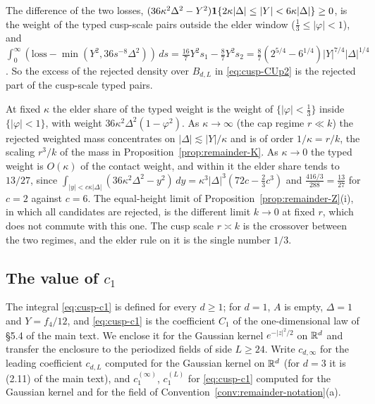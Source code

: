 \begin{remark}\label{rem:cusp-rejected}
The difference of the two losses, $(36\kappa^2\Delta^2-Y^2)\mathbf 1\{2\kappa|\Delta|\le|Y|<6\kappa|\Delta|\}\ge0$, is the weight of the typed cusp-scale pairs outside the elder window ($\frac13\le|\varphi|<1$), and $\int_0^\infty(\mathrm{loss}-\min(Y^2,36s^{-8}\Delta^2))\,ds=\frac{16}7Y^2s_1-\frac87Y^2s_2=\frac87(2^{5/4}-6^{1/4})|Y|^{7/4}|\Delta|^{1/4}$. So the excess of the rejected density over $B_{d,L}$ in \eqref{eq:cusp-CUp2} is the rejected part of the cusp-scale typed pairs.
\end{remark}

\begin{remark}\label{rem:cusp-crossover}
At fixed $\kappa$ the elder share of the typed weight is the weight of $\{|\varphi|<\frac13\}$ inside $\{|\varphi|<1\}$, with weight $36\kappa^2\Delta^2(1-\varphi^2)$. As $\kappa\to\infty$ (the cap regime $r\ll k$) the rejected weighted mass concentrates on $|\Delta|\lesssim|Y|/\kappa$ and is of order $1/\kappa=r/k$, the scaling $r^3/k$ of the mass in Proposition~\ref{prop:remainder-K}. As $\kappa\to0$ the typed weight is $O(\kappa)$ of the contact weight, and within it the elder share tends to $13/27$, since $\int_{|y|<c\kappa|\Delta|}(36\kappa^2\Delta^2-y^2)\,dy=\kappa^3|\Delta|^3(72c-\frac23c^3)$ and $\frac{416/3}{288}=\frac{13}{27}$ for $c=2$ against $c=6$. The equal-height limit of Proposition~\ref{prop:remainder-Z}(i), in which all candidates are rejected, is the different limit $k\to0$ at fixed $r$, which does not commute with this one. The cusp scale $r\asymp k$ is the crossover between the two regimes, and the elder rule on it is the single number $1/3$.
\end{remark}

\subsection{The value of \texorpdfstring{$c_1$}{c1}}\label{ssec:cusp-value}

The integral \eqref{eq:cusp-c1} is defined for every $d\ge1$; for $d=1$, $A$ is empty, $\Delta=1$ and $Y=f_4/12$, and \eqref{eq:cusp-c1} is the coefficient $C_1$ of the one-dimensional law of \S5.4 of the main text. We enclose it for the Gaussian kernel $e^{-|z|^2/2}$ on $\mathbb R^d$ and transfer the enclosure to the periodized fields of side $L\ge24$. Write $c_{d,\infty}$ for the leading coefficient $c_{d,L}$ computed for the Gaussian kernel on $\mathbb R^d$ (for $d=3$ it is (2.11) of the main text), and $c_1^{(\infty)}$, $c_1^{(L)}$ for \eqref{eq:cusp-c1} computed for the Gaussian kernel and for the field of Convention~\ref{conv:remainder-notation}(a).

